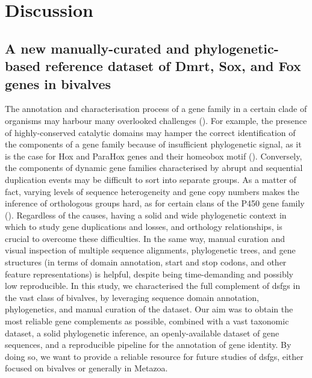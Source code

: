 \section{Discussion} \label{chpater3-discussion}
\subsection{A new manually-curated and phylogenetic-based reference dataset of Dmrt, Sox, and Fox genes in bivalves}
The annotation and characterisation process of a gene family in a certain clade of organisms may harbour many overlooked challenges (). For example, the presence of highly-conserved catalytic domains may hamper the correct identification of the components of a gene family because of insufficient phylogenetic signal, as it is the case for Hox and ParaHox genes and their homeobox motif (). Conversely, the components of dynamic gene families characterised by abrupt and sequential duplication events may be difficult to sort into separate groups. As a matter of fact, varying levels of sequence heterogeneity and gene copy numbers makes the inference of orthologous groups hard, as for certain clans of the P450 gene family (). Regardless of the causes, having a solid and wide phylogenetic context in which to study gene duplications and losses, and orthology relationships, is crucial to overcome these difficulties. In the same way, manual curation and visual inspection of multiple sequence alignments, phylogenetic trees, and gene structures (in terms of domain annotation, start and stop codons, and other feature representations) is helpful, despite being time-demanding and possibly low reproducible. In this study, we characterised the full complement of \glspl{dsfg} in the vast class of bivalves, by leveraging sequence domain annotation, phylogenetics, and manual curation of the dataset. Our aim was to obtain the most reliable gene complements as possible, combined with a vast taxonomic dataset, a solid phylogenetic inference, an openly-available dataset of gene sequences, and a reproducible pipeline for the annotation of gene identity. By doing so, we want to provide a reliable resource for future studies of \glspl{dsfg}, either focused on bivalves or generally in Metazoa.

